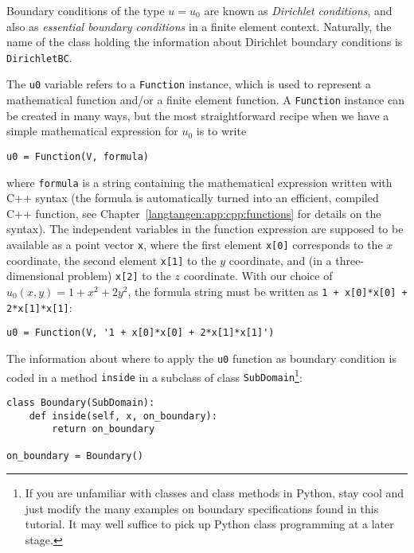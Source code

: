 Boundary conditions
of the type $u=u_0$ are known as \emph{Dirichlet conditions}, and also
as \emph{essential boundary conditions} in a finite element context.
Naturally, the name of the \dolfin{} class holding the information about
Dirichlet boundary conditions is {\fontsize{12pt}{12pt}\texttt{DirichletBC}}.

The {\fontsize{12pt}{12pt}\verb!u0!} variable refers to a {\fontsize{12pt}{12pt}\verb!Function!} instance, which
is used to represent a mathematical function and/or a finite element
function.
A {\fontsize{12pt}{12pt}\texttt{Function}} instance
can be created in many ways, but the most straightforward recipe when
we have a simple mathematical expression for $u_0$ is to write
\begin{Verbatim}[fontsize=\fontsize{10pt}{10pt},tabsize=8,baselinestretch=1.05,
fontfamily=tt,xleftmargin=7mm]
u0 = Function(V, formula)
\end{Verbatim}
\noindent
where {\fontsize{12pt}{12pt}\verb!formula!} is a string containing the mathematical expression
written with C++ syntax (the formula is 
automatically turned into an efficient, compiled
C++ function, see Chapter~\ref{langtangen:app:cpp:functions} for
details on the syntax). The independent variables in the function
expression are supposed to be available
as a point vector {\fontsize{12pt}{12pt}\verb!x!}, where the first element {\fontsize{12pt}{12pt}\verb!x[0]!}
corresponds to the $x$ coordinate, the second element {\fontsize{12pt}{12pt}\verb!x[1]!}
to the $y$ coordinate, and (in a three-dimensional problem)
{\fontsize{12pt}{12pt}\verb!x[2]!} to the $z$ coordinate. With our choice of
$u_0(x,y)=1 + x^2 + 2y^2$, the formula string must be written
as {\fontsize{12pt}{12pt}\verb!1 + x[0]*x[0] + 2*x[1]*x[1]!}:
\begin{Verbatim}[fontsize=\fontsize{10pt}{10pt},tabsize=8,baselinestretch=1.05,
fontfamily=tt,xleftmargin=7mm]
u0 = Function(V, '1 + x[0]*x[0] + 2*x[1]*x[1]')
\end{Verbatim}
\noindent
The information about where to apply the {\fontsize{12pt}{12pt}\verb!u0!} function as
boundary condition is coded in a method {\fontsize{12pt}{12pt}\verb!inside!}
in a subclass of class {\fontsize{12pt}{12pt}\verb!SubDomain!}\footnote{If you are unfamiliar with
classes and class methods in Python, stay cool and just modify the
many examples on boundary specifications found in this tutorial.
It may well suffice to pick up Python class programming at a later stage.}:
\begin{Verbatim}[fontsize=\fontsize{10pt}{10pt},tabsize=8,baselinestretch=1.05,
fontfamily=tt,xleftmargin=7mm]
class Boundary(SubDomain):
    def inside(self, x, on_boundary):
        return on_boundary

on_boundary = Boundary()
\end{Verbatim}
